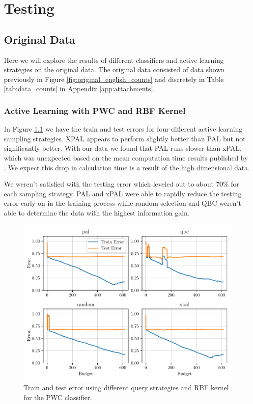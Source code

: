 \chapter{Testing}

\section{Original Data}

Here we will explore the results of different classifiers and active learning strategies on the original data. The original data consisted of data shown previously in Figure \ref{fig:original_english_counts} and discretely in Table \ref{tab:data_counts} in Appendix \ref{app:attachments}. 

\subsection{Active Learning with PWC and RBF Kernel}

In Figure \ref{fig:plot_all_results_rbf} we have the train and test errors for four different active learning sampling strategies. XPAL appears to perform slightly better than PAL but not significantly better. With our data we found that PAL runs slower than xPAL, which was unexpected based on the mean computation time results published by \cite{kottke2021toward}. We expect this drop in calculation time is a result of the high dimensional data.

We weren't satisfied with the testing error which leveled out to about 70\% for each sampling strategy. PAL and xPAL were able to rapidly reduce the testing error early on in the training process while random selection and QBC weren't able to determine the data with the highest information gain. 

\begin{figure}[ht]
  \centering
  \includegraphics[width=\scale\textwidth]{../img/plot_all_results_rbf.pdf}
  \caption{Train and test error using different query strategies and RBF kernel for the PWC classifier.}
  \label{fig:plot_all_results_rbf}
\end{figure}

